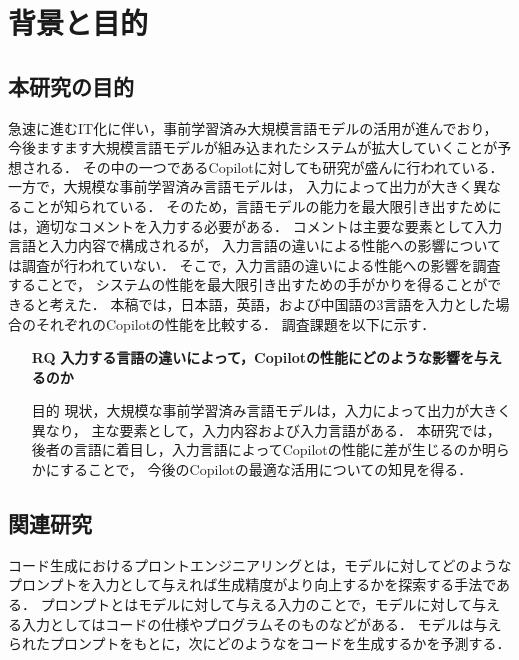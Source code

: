 \section{背景と目的\label{related_research}}

\subsection{本研究の目的}
  急速に進むIT化に伴い，事前学習済み大規模言語モデルの活用が進んでおり，
  今後ますます大規模言語モデルが組み込まれたシステムが拡大していくことが予想される．
  その中の一つであるCopilotに対しても研究が盛んに行われている\cite{Yao2022ACL}\cite{Nguyen2022MSR}\cite{Sobania2022GECCO}\cite{Dakhel2022arXiv}\cite{Vaithilingam2022CHI}．
  一方で，大規模な事前学習済み言語モデルは，
  入力によって出力が大きく異なることが知られている\cite{Yao2022ACL}．
  そのため，言語モデルの能力を最大限引き出すためには，適切なコメントを入力する必要がある．
  コメントは主要な要素として入力言語と入力内容で構成されるが，
  入力言語の違いによる性能への影響については調査が行われていない．
  そこで，入力言語の違いによる性能への影響を調査することで，
  システムの性能を最大限引き出すための手がかりを得ることができると考えた．
  本稿では，日本語，英語，および中国語の3言語を入力とした場合のそれぞれのCopilotの性能を比較する．
  調査課題を以下に示す．

  
  \begin{itemize}
    \item[\textbf{RQ}] \textbf{入力する言語の違いによって，Copilotの性能にどのような影響を与えるのか}
      \item[目的]{
      現状，大規模な事前学習済み言語モデルは，入力によって出力が大きく異なり，
      主な要素として，入力内容および入力言語がある．
      本研究では，後者の言語に着目し，入力言語によってCopilotの性能に差が生じるのか明らかにすることで，
      今後のCopilotの最適な活用についての知見を得る．}
  \end{itemize}

\subsection{関連研究}
  コード生成におけるプロントエンジニアリングとは，モデルに対してどのようなプロンプトを入力として与えれば生成精度がより向上するかを探索する手法である．
  プロンプトとはモデルに対して与える入力のことで，モデルに対して与える入力としてはコードの仕様やプログラムそのものなどがある．
  モデルは与えられたプロンプトをもとに，次にどのようなをコードを生成するかを予測する．
  
